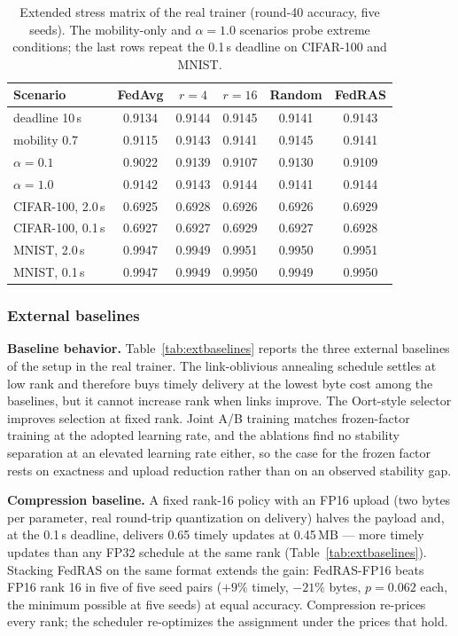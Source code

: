 \documentclass[a4paper,fleqn]{cas-dc}
\begin{document}
\begin{table}[pos=tbp]
\centering\footnotesize
\caption{Extended stress matrix of the real trainer (round-40 accuracy, five seeds). The mobility-only and $\alpha{=}1.0$ scenarios probe extreme conditions; the last rows repeat the 0.1\,s deadline on CIFAR-100 and MNIST.}
\label{tab:extended}
\begin{tabular}{l ccccc}
\toprule
Scenario & FedAvg & $r{=}4$ & $r{=}16$ & Random & FedRAS\\
\midrule
deadline 10\,s & 0.9134 & 0.9144 & 0.9145 & 0.9141 & 0.9143\\
mobility 0.7 & 0.9115 & 0.9143 & 0.9141 & 0.9145 & 0.9141\\
$\alpha{=}0.1$ & 0.9022 & 0.9139 & 0.9107 & 0.9130 & 0.9109\\
$\alpha{=}1.0$ & 0.9142 & 0.9143 & 0.9144 & 0.9141 & 0.9144\\
CIFAR-100, 2.0\,s & 0.6925 & 0.6928 & 0.6926 & 0.6926 & 0.6929\\
CIFAR-100, 0.1\,s & 0.6927 & 0.6927 & 0.6929 & 0.6927 & 0.6928\\
MNIST, 2.0\,s & 0.9947 & 0.9949 & 0.9951 & 0.9950 & 0.9951\\
MNIST, 0.1\,s & 0.9947 & 0.9949 & 0.9950 & 0.9949 & 0.9950\\
\bottomrule
\end{tabular}
\end{table}


\subsubsection{External baselines}
\label{sec:extbase}
\textbf{Baseline behavior.} Table~\ref{tab:extbaselines} reports the three external baselines of the setup in the real trainer. The link-oblivious annealing schedule settles at low rank and therefore buys timely delivery at the lowest byte cost among the baselines, but it cannot increase rank when links improve. The Oort-style selector improves selection at fixed rank. Joint A/B training matches frozen-factor training at the adopted learning rate, and the ablations find no stability separation at an elevated learning rate either, so the case for the frozen factor rests on exactness and upload reduction rather than on an observed stability gap.

\textbf{Compression baseline.} A fixed rank-16 policy with an FP16 upload (two bytes per parameter, real round-trip quantization on delivery) halves the payload and, at the 0.1\,s deadline, delivers 0.65 timely updates at 0.45\,MB --- more timely updates than any FP32 schedule at the same rank (Table~\ref{tab:extbaselines}). Stacking FedRAS on the same format extends the gain: FedRAS-FP16 beats FP16 rank 16 in five of five seed pairs ($+9\%$ timely, $-21\%$ bytes, $p{=}0.062$ each, the minimum possible at five seeds) at equal accuracy. Compression re-prices every rank; the scheduler re-optimizes the assignment under the prices that hold.
\end{document}
